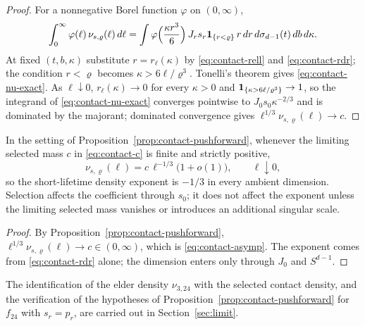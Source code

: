 \begin{proof}
For a nonnegative Borel function $\varphi$ on $(0,\infty)$,
\[
\int_0^\infty\varphi(\ell)\,\nu_{s,\varrho}(\ell)\,d\ell=\int\varphi\Bigl(\frac{\kappa r^3}6\Bigr)\,J_rs_r\mathbf 1_{\{r<\varrho\}}\,r\,dr\,d\sigma_{d-1}(t)\,db\,d\kappa .
\]
At fixed $(t,b,\kappa)$ substitute $r=r_\ell(\kappa)$ by \eqref{eq:contact-rell} and \eqref{eq:contact-rdr}; the condition $r<\varrho$ becomes $\kappa>6\ell/\varrho^3$. Tonelli's theorem gives \eqref{eq:contact-nu-exact}. As $\ell\downarrow0$, $r_\ell(\kappa)\to0$ for every $\kappa>0$ and $\mathbf 1_{\{\kappa>6\ell/\varrho^3\}}\to1$, so the integrand of \eqref{eq:contact-nu-exact} converges pointwise to $J_0s_0\kappa^{-2/3}$ and is dominated by the majorant; dominated convergence gives $\ell^{1/3}\nu_{s,\varrho}(\ell)\to c$.
\end{proof}

\begin{theorem}\label{thm:contact-exponent}
In the setting of Proposition~\ref{prop:contact-pushforward}, whenever the limiting selected mass $c$ in \eqref{eq:contact-c} is finite and strictly positive,
\begin{equation}\label{eq:contact-asymp}
\nu_{s,\varrho}(\ell)=c\,\ell^{-1/3}\bigl(1+o(1)\bigr),\qquad\ell\downarrow0,
\end{equation}
so the short-lifetime density exponent is $-1/3$ in every ambient dimension. Selection affects the coefficient through $s_0$; it does not affect the exponent unless the limiting selected mass vanishes or introduces an additional singular scale.
\end{theorem}

\begin{proof}
By Proposition~\ref{prop:contact-pushforward}, $\ell^{1/3}\nu_{s,\varrho}(\ell)\to c\in(0,\infty)$, which is \eqref{eq:contact-asymp}. The exponent comes from \eqref{eq:contact-rdr} alone; the dimension enters only through $J_0$ and $S^{d-1}$.
\end{proof}

The identification of the elder density $\nu_{3,24}$ with the selected contact density, and the verification of the hypotheses of Proposition~\ref{prop:contact-pushforward} for $f_{24}$ with $s_r=p_r$, are carried out in Section~\ref{sec:limit}.

